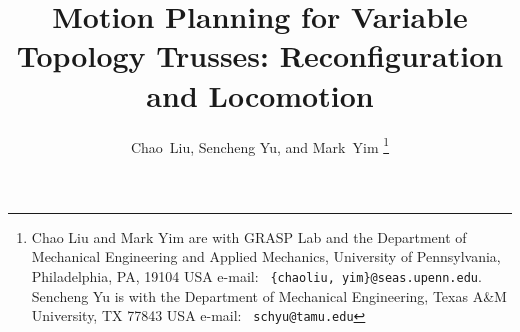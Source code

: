 \documentclass[journal]{IEEEtran}
\begin{document}
%
\title{Motion Planning for Variable Topology Trusses:
  Reconfiguration and Locomotion}
%
%
%

\author{Chao~Liu, Sencheng Yu, and Mark~Yim%
  \thanks{Chao Liu and Mark Yim are with GRASP Lab and the Department of Mechanical
    Engineering and Applied Mechanics, University of Pennsylvania,
    Philadelphia, PA, 19104 USA e-mail: {\tt\footnotesize
      \{chaoliu, yim\}@seas.upenn.edu}. Sencheng Yu is with
    the Department of Mechanical Engineering, Texas A\&M University, TX 77843 USA e-mail:
    {\tt\footnotesize
      schyu@tamu.edu}}%
}

%
%



%
\end{document}

